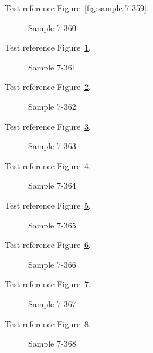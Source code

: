 Test reference Figure~\ref{fig:sample-7-359}.

\begin{figure}[tbhp]
\caption{Sample 7-360}
\label{fig:sample-7-360}
\end{figure}

Test reference Figure~\ref{fig:sample-7-360}.

\begin{figure}[tbhp]
\caption{Sample 7-361}
\label{fig:sample-7-361}
\end{figure}

Test reference Figure~\ref{fig:sample-7-361}.

\begin{figure}[tbhp]
\caption{Sample 7-362}
\label{fig:sample-7-362}
\end{figure}

Test reference Figure~\ref{fig:sample-7-362}.

\begin{figure}[tbhp]
\caption{Sample 7-363}
\label{fig:sample-7-363}
\end{figure}

Test reference Figure~\ref{fig:sample-7-363}.

\begin{figure}[tbhp]
\caption{Sample 7-364}
\label{fig:sample-7-364}
\end{figure}

Test reference Figure~\ref{fig:sample-7-364}.

\begin{figure}[tbhp]
\caption{Sample 7-365}
\label{fig:sample-7-365}
\end{figure}

Test reference Figure~\ref{fig:sample-7-365}.

\begin{figure}[tbhp]
\caption{Sample 7-366}
\label{fig:sample-7-366}
\end{figure}

Test reference Figure~\ref{fig:sample-7-366}.

\begin{figure}[tbhp]
\caption{Sample 7-367}
\label{fig:sample-7-367}
\end{figure}

Test reference Figure~\ref{fig:sample-7-367}.

\begin{figure}[tbhp]
\caption{Sample 7-368}
\label{fig:sample-7-368}
\end{figure}

